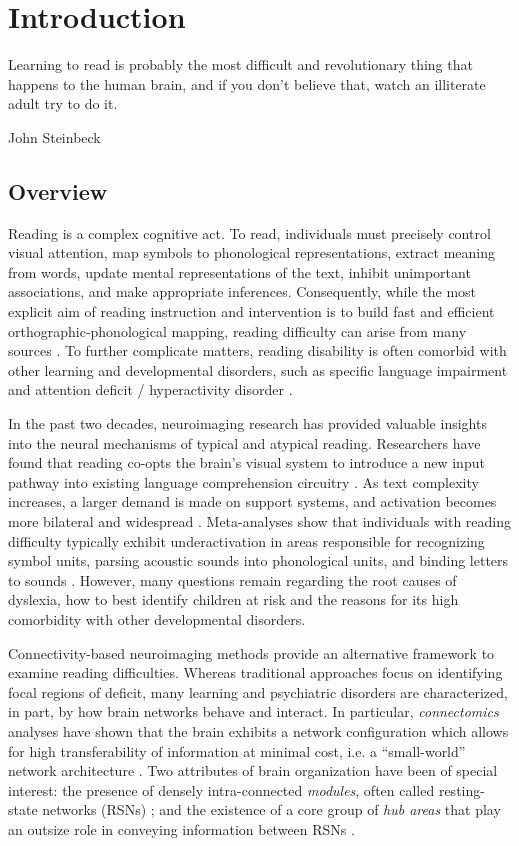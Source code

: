 \chapter{Introduction}

\epigraph{Learning to read is probably the most difficult and revolutionary thing that happens to the human brain, and if you don't believe that, watch an illiterate adult try to do it.}{John Steinbeck}

\section{Overview}
Reading is a complex cognitive act. To read, individuals must precisely control visual attention, map symbols to phonological representations, extract meaning from words, update mental representations of the text, inhibit unimportant associations, and make appropriate inferences. Consequently, while the most explicit aim of reading instruction and intervention is to build fast and efficient orthographic-phonological mapping, reading difficulty can arise from many sources \citep{Pennington2009, vanderLely2010}. To further complicate matters, reading disability is often comorbid with other learning and developmental disorders, such as specific language impairment and attention deficit / hyperactivity disorder \citep{Pennington2006, Margari2013}.

In the past two decades, neuroimaging research has provided valuable insights into the neural mechanisms of typical and atypical reading. Researchers have found that reading co-opts the brain's visual system to introduce a new input pathway into existing language comprehension circuitry \citep{Jobard2007}. As text complexity increases, a larger demand is made on support systems, and activation becomes more bilateral and widespread \citep{Xu2005}.  Meta-analyses show that individuals with reading difficulty typically exhibit underactivation in areas responsible for recognizing symbol units, parsing acoustic sounds into phonological units, and binding letters to sounds \citep{Maisog2008, Richlan2009, Paulesu2014}. However, many questions remain regarding the root causes of dyslexia, how to best identify children at risk and the reasons for its high comorbidity with other developmental disorders. 

Connectivity-based neuroimaging methods provide an alternative framework to examine reading difficulties. Whereas traditional approaches focus on identifying focal regions of deficit, many learning and psychiatric disorders are characterized, in part, by how brain networks behave and interact. In particular, \textit{connectomics} analyses have shown that the brain exhibits a network configuration which allows for high transferability of information at minimal cost, i.e. a “small-world” network architecture \citep{Bullmore2012}. Two attributes of brain organization have been of special interest: the presence of densely intra-connected \textit{modules}, often called resting-state networks (RSNs) \citep{Sporns2016}; and the existence of a core group of \textit{hub areas} that play an outsize role in conveying information between RSNs \citep{VandenHeuvel2011}. 

